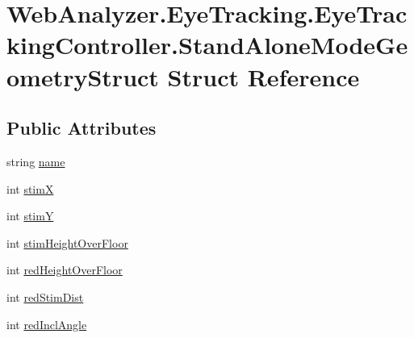 \hypertarget{struct_web_analyzer_1_1_eye_tracking_1_1_eye_tracking_controller_1_1_stand_alone_mode_geometry_struct}{}\section{Web\+Analyzer.\+Eye\+Tracking.\+Eye\+Tracking\+Controller.\+Stand\+Alone\+Mode\+Geometry\+Struct Struct Reference}
\label{struct_web_analyzer_1_1_eye_tracking_1_1_eye_tracking_controller_1_1_stand_alone_mode_geometry_struct}
\subsection*{Public Attributes}
\begin{DoxyCompactItemize}
\item 
string \hyperlink{struct_web_analyzer_1_1_eye_tracking_1_1_eye_tracking_controller_1_1_stand_alone_mode_geometry_struct_a99a07b3d9c2c8b5b5be9bb68a6f709e8}{name}
\item 
int \hyperlink{struct_web_analyzer_1_1_eye_tracking_1_1_eye_tracking_controller_1_1_stand_alone_mode_geometry_struct_a64b395f1a76ba2f691c0ef01259168ba}{stim\+X}
\item 
int \hyperlink{struct_web_analyzer_1_1_eye_tracking_1_1_eye_tracking_controller_1_1_stand_alone_mode_geometry_struct_ace1c440c06b7d36fc8b6fe6470bfc315}{stim\+Y}
\item 
int \hyperlink{struct_web_analyzer_1_1_eye_tracking_1_1_eye_tracking_controller_1_1_stand_alone_mode_geometry_struct_a33965e997efc83dd71a23c08a80db5ee}{stim\+Height\+Over\+Floor}
\item 
int \hyperlink{struct_web_analyzer_1_1_eye_tracking_1_1_eye_tracking_controller_1_1_stand_alone_mode_geometry_struct_ab453573afa4c323e2bfe5bdd1ed72f39}{red\+Height\+Over\+Floor}
\item 
int \hyperlink{struct_web_analyzer_1_1_eye_tracking_1_1_eye_tracking_controller_1_1_stand_alone_mode_geometry_struct_ada1bbe499893c3314e63e40373dd3c10}{red\+Stim\+Dist}
\item 
int \hyperlink{struct_web_analyzer_1_1_eye_tracking_1_1_eye_tracking_controller_1_1_stand_alone_mode_geometry_struct_adde1aaeb13c4a698633b5633582592ea}{red\+Incl\+Angle}
\end{DoxyCompactItemize}


